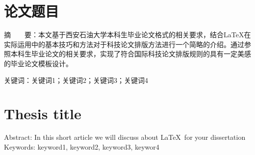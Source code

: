 \thispagestyle{empty} 
\section*{ \centering 论文题目}

\vspace{0.5cm}
\noindent 摘~~~~要：本文基于西安石油大学本科生毕业论文格式的相关要求，结合\LaTeX 在实际运用中的基本技巧和方法对于科技论文排版方法进行一个简略的介绍。通过参照本科生毕业论文的相关要求，实现了符合国际科技论文排版规则的具有一定美感的毕业论文模板设计。 

\vspace{0.5cm}
\noindent
关键词：关键词1；关键词2；关键词3；关键词4

\clearpage
\thispagestyle{empty} 
\section*{\songti{} \centering \textbf{Thesis title} }

\noindent 
Abstract: In this short article we will discuss about \LaTeX\,  for your dissertation\\

\noindent 
Keywords: keyword1,  keyword2, keyword3, keywor4




